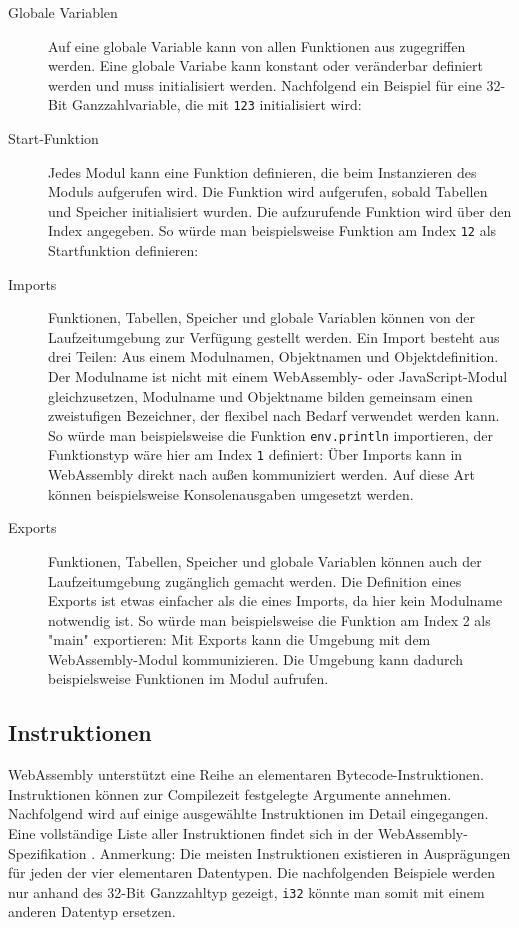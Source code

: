 \begin{description}
    \item[Globale Variablen] Auf eine globale Variable kann von allen Funktionen aus zugegriffen werden. Eine globale Variabe kann konstant oder veränderbar definiert werden und muss initialisiert werden. Nachfolgend ein Beispiel für eine 32-Bit Ganzzahlvariable, die mit \lstinline{123} initialisiert wird: 
    \item[Start-Funktion] Jedes Modul kann eine Funktion definieren, die beim Instanzieren des Moduls aufgerufen wird. Die Funktion wird aufgerufen, sobald Tabellen und Speicher initialisiert wurden. Die aufzurufende Funktion wird über den Index angegeben. So würde man beispielsweise Funktion am Index \lstinline{12} als Startfunktion definieren: 
    \item[Imports] Funktionen, Tabellen, Speicher und globale Variablen können von der Laufzeitumgebung zur Verfügung gestellt werden. Ein Import besteht aus drei Teilen: Aus einem Modulnamen, Objektnamen und Objektdefinition. Der Modulname ist nicht mit einem WebAssembly- oder JavaScript-Modul gleichzusetzen, Modulname und Objektname bilden gemeinsam einen zweistufigen Bezeichner, der flexibel nach Bedarf verwendet werden kann. So würde man beispielsweise die Funktion \lstinline{env.println} importieren, der Funktionstyp wäre hier am Index \lstinline{1} definiert: 
    Über Imports kann in WebAssembly direkt nach außen kommuniziert werden. Auf diese Art können beispielsweise Konsolenausgaben umgesetzt werden.
    \item[Exports] Funktionen, Tabellen, Speicher und globale Variablen können auch der Laufzeitumgebung zugänglich gemacht werden. Die Definition eines Exports ist etwas einfacher als die eines Imports, da hier kein Modulname notwendig ist. So würde man beispielsweise die Funktion am Index 2 als "main" exportieren: 
    Mit Exports kann die Umgebung mit dem WebAssembly-Modul kommunizieren. Die Umgebung kann dadurch beispielsweise Funktionen im Modul aufrufen.
\end{description}

\subsection{Instruktionen}
\label{subsec:WebAssembly-Instruktionen}
WebAssembly unterstützt eine Reihe an elementaren Bytecode-Instruktionen. Instruktionen können zur Compilezeit festgelegte Argumente annehmen. Nachfolgend wird auf einige ausgewählte Instruktionen im Detail eingegangen. Eine vollständige Liste aller Instruktionen findet sich in der WebAssembly-Spezifikation \cite{WebAssemblySpecification}. Anmerkung: Die meisten Instruktionen existieren in Ausprägungen für jeden der vier elementaren Datentypen. Die nachfolgenden Beispiele werden nur anhand des 32-Bit Ganzzahltyp gezeigt, \lstinline{i32} könnte man somit mit einem anderen Datentyp ersetzen.

